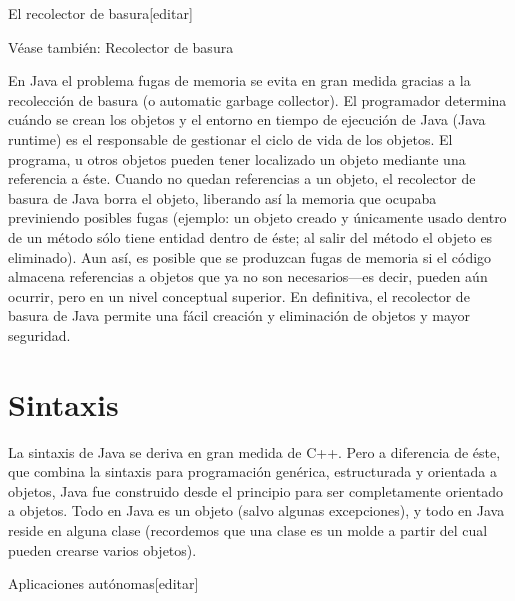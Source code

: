 \documentclass[11pt,a4paper]{book}
\begin{document}
	\bigskip
							El recolector de basura[editar]
	\bigskip
							
	\bigskip
							Véase también: Recolector de basura
	\bigskip
							
	\bigskip
							En Java el problema fugas de memoria se evita en gran medida gracias a la recolección de basura (o automatic garbage collector). El programador determina cuándo se crean los objetos y el entorno en tiempo de ejecución de Java (Java runtime) es el responsable de gestionar el ciclo de vida de los objetos. El programa, u otros objetos pueden tener localizado un objeto mediante una referencia a éste. Cuando no quedan referencias a un objeto, el recolector de basura de Java borra el objeto, liberando así la memoria que ocupaba previniendo posibles fugas (ejemplo: un objeto creado y únicamente usado dentro de un método sólo tiene entidad dentro de éste; al salir del método el objeto es eliminado). Aun así, es posible que se produzcan fugas de memoria si el código almacena referencias a objetos que ya no son necesarios—es decir, pueden aún ocurrir, pero en un nivel conceptual superior. En definitiva, el recolector de basura de Java permite una fácil creación y eliminación de objetos y mayor seguridad.
	\bigskip
			
			\chapter{Sintaxis}
												La sintaxis de Java se deriva en gran medida de C++. Pero a diferencia de éste, que combina la sintaxis para programación genérica, estructurada y orientada a objetos, Java fue construido desde el principio para ser completamente orientado a objetos. Todo en Java es un objeto (salvo algunas excepciones), y todo en Java reside en alguna clase (recordemos que una clase es un molde a partir del cual pueden crearse varios objetos).
	\bigskip
							
	\bigskip
							Aplicaciones autónomas[editar]
	\bigskip
							
\end{document}
